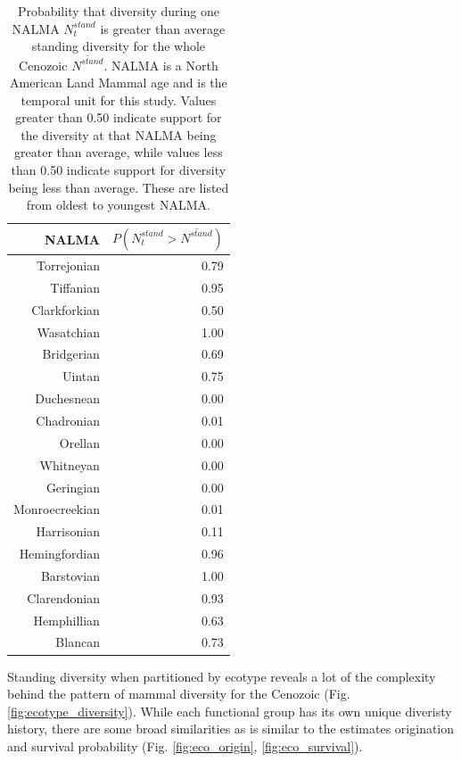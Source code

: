 \documentclass[12pt,letterpaper]{article}
\begin{document}
\begin{table}[ht]
  \centering
  \caption{Probability that diversity during one NALMA \(N^{stand}_{t}\) is greater than average standing diversity for the whole Cenozoic \(\overline{N^{stand}}\). NALMA is a North American Land Mammal age and is the temporal unit for this study. Values greater than 0.50 indicate support for the diversity at that NALMA being greater than average, while values less than 0.50 indicate support for diversity being less than average. These are listed from oldest to youngest NALMA.}
  \label{tab:div_peak}
  \begin{tabular}{ r r }
    \hline
    NALMA & \(P(N^{stand}_{t} > \overline{N^{stand}})\) \\
    \hline
    Torrejonian & 0.79 \\ 
    Tiffanian & 0.95 \\ 
    Clarkforkian & 0.50 \\ 
    Wasatchian & 1.00 \\ 
    Bridgerian & 0.69 \\ 
    Uintan & 0.75 \\ 
    Duchesnean & 0.00 \\ 
    Chadronian & 0.01 \\ 
    Orellan & 0.00 \\ 
    Whitneyan & 0.00 \\ 
    Geringian & 0.00 \\ 
    Monroecreekian & 0.01 \\ 
    Harrisonian & 0.11 \\ 
    Hemingfordian & 0.96 \\ 
    Barstovian & 1.00 \\ 
    Clarendonian & 0.93 \\ 
    Hemphillian & 0.63 \\ 
    Blancan & 0.73 \\ 
    \hline
  \end{tabular}
\end{table}


Standing diversity when partitioned by ecotype reveals a lot of the complexity behind the pattern of mammal diversity for the Cenozoic (Fig. \ref{fig:ecotype_diversity}). While each functional group has its own unique diveristy history, there are some broad similarities as is similar to the estimates origination and survival probability (Fig. \ref{fig:eco_origin}, \ref{fig:eco_survival}).
\end{document}
